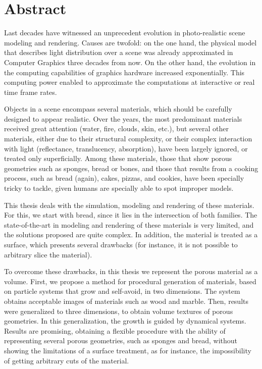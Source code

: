 \documentclass[spanish,a4paper,oneside,10pt,openright]{book}
\begin{document}
\phantom{p. 1}
\clearpage
\thispagestyle{empty}

\chapter*{Abstract} %

Last decades have witnessed an unprecedent evolution in photo-realistic scene modeling and rendering.
Causes are twofold: on the one hand, the physical model that describes light distribution over a scene was already approximated in Computer Graphics three decades from now.
On the other hand, the evolution in the computing capabilities of graphics hardware increased exponentially.
This computing power enabled to approximate the computations at interactive or real time frame rates.

Objects in a scene encompass several materials, which should be carefully designed to appear realistic.
Over the years, the most predominant materials received great attention (water, fire, clouds, skin, etc.), but several other materials, either due to their structural complexity, or their complex interaction with light (reflectance, translucency, absorption), have been largely ignored, or treated only superficially.
Among these materials, those that show porous geometries such as sponges, bread or bones, and those that results from a cooking process, such as bread (again), cakes, pizzas, and cookies, have been specially tricky to tackle, given humans are specially able to spot improper models.

This thesis deals with the simulation, modeling and rendering of these materials.
For this, we start with bread, since it lies in the intersection of both families.
The state-of-the-art in modeling and rendering of these materials is very limited, and the solutions proposed are quite complex.
In addition, the material is treated as a surface, which presents several drawbacks (for instance, it is not possible to arbitrary slice the material).

To overcome these drawbacks, in this thesis we represent the porous material as a volume.
First, we propose a method for procedural generation of materials, based on particle systems that grow and self-avoid, in two dimensions.
The system obtains acceptable images of materials such as wood and marble.
Then, results were generalized to three dimensions, to obtain volume textures of porous geometries.
In this generalization, the growth is guided by dynamical systems.
Results are promising, obtaining a flexible procedure with the ability of representing several porous geometries, such as sponges and bread, without showing the limitations of a surface treatment, as for instance, the impossibility of getting arbitrary cuts of the material.
\end{document}
